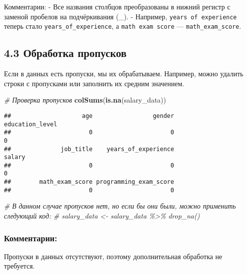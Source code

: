\documentclass[
]{article}
\newenvironment{Shaded}{\begin{snugshade}}{\end{snugshade}}
\newcommand{\CommentTok}[1]{\textcolor[rgb]{0.56,0.35,0.01}{\textit{#1}}}
\newcommand{\FunctionTok}[1]{\textcolor[rgb]{0.13,0.29,0.53}{\textbf{#1}}}
\newcommand{\NormalTok}[1]{#1}
\begin{document}
Комментарии: - Все названия столбцов преобразованы в нижний регистр с
заменой пробелов на подчёркивания (\_). - Например,
\texttt{years\ of\ experience} теперь стало
\texttt{years\_of\_experience}, а \texttt{math\ exam\ score} ---
\texttt{math\_exam\_score}.

\subsection{4.3 Обработка
пропусков}\label{ux43eux431ux440ux430ux431ux43eux442ux43aux430-ux43fux440ux43eux43fux443ux441ux43aux43eux432}

Если в данных есть пропуски, мы их обрабатываем. Например, можно удалить
строки с пропусками или заполнить их средним значением.

\begin{Shaded}
\begin{Highlighting}[]
\CommentTok{\# Проверка пропусков}
\FunctionTok{colSums}\NormalTok{(}\FunctionTok{is.na}\NormalTok{(salary\_data))}
\end{Highlighting}
\end{Shaded}

\begin{verbatim}
##                    age                 gender        education_level 
##                      0                      0                      0 
##              job_title    years_of_experience                 salary 
##                      0                      0                      0 
##        math_exam_score programming_exam_score 
##                      0                      0
\end{verbatim}

\begin{Shaded}
\begin{Highlighting}[]
\CommentTok{\# В данном случае пропусков нет, но если бы они были, можно применить следующий код:}
\CommentTok{\# salary\_data \textless{}{-} salary\_data \%\textgreater{}\% drop\_na()}
\end{Highlighting}
\end{Shaded}

\subsubsection{Комментарии:}\label{ux43aux43eux43cux43cux435ux43dux442ux430ux440ux438ux438}

Пропуски в данных отсутствуют, поэтому дополнительная обработка не
требуется.
\end{document}

